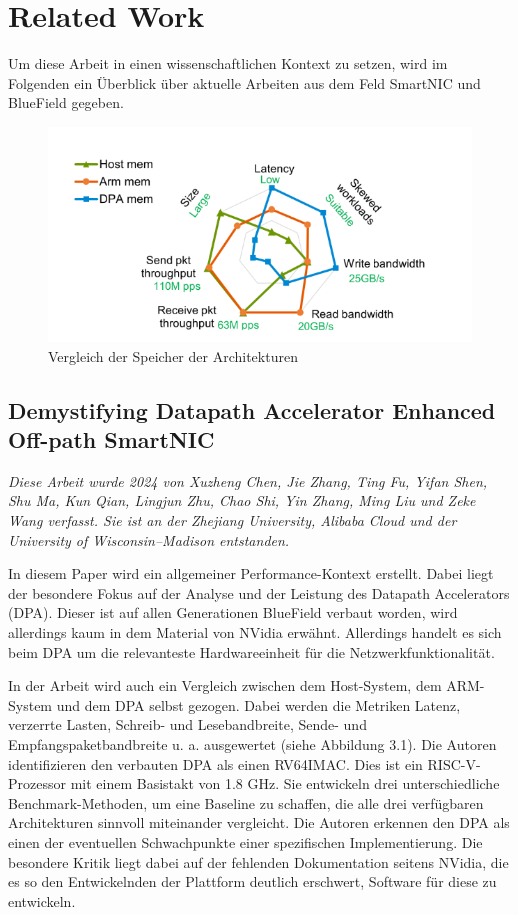 \chapter{Related Work}
Um diese Arbeit in einen wissenschaftlichen Kontext zu setzen, wird im Folgenden ein Überblick über aktuelle Arbeiten aus dem Feld SmartNIC und BlueField gegeben.
\begin{figure}
    \centering
    \includegraphics[width=0.7\linewidth]{images/DPARam.png}
    \caption{Vergleich der Speicher der Architekturen \cite{chen2024demystifying}}
    \label{fig:enter-label}
\end{figure}
\section{Demystifying Datapath Accelerator Enhanced Off-path SmartNIC}
\textit{Diese Arbeit wurde 2024 von Xuzheng Chen, Jie Zhang, Ting Fu, Yifan Shen, Shu Ma, Kun Qian, Lingjun Zhu, Chao Shi, Yin Zhang, Ming Liu und Zeke Wang verfasst. Sie ist an der Zhejiang University, Alibaba Cloud und der University of Wisconsin–Madison entstanden.}\cite{chen2024demystifying}

In diesem Paper wird ein allgemeiner Performance-Kontext erstellt. Dabei liegt der besondere Fokus auf der Analyse und der Leistung des Datapath Accelerators (DPA). Dieser ist auf allen Generationen BlueField verbaut worden, wird allerdings kaum in dem Material von NVidia erwähnt. Allerdings handelt es sich beim DPA um die relevanteste Hardwareeinheit für die Netzwerkfunktionalität. 

In der Arbeit wird auch ein Vergleich zwischen dem Host-System, dem ARM-System und dem DPA selbst gezogen. Dabei werden die Metriken Latenz, verzerrte Lasten, Schreib- und Lesebandbreite, Sende- und Empfangspaketbandbreite u. a. ausgewertet (siehe Abbildung 3.1). Die Autoren identifizieren den verbauten DPA als einen RV64IMAC. Dies ist ein RISC-V-Prozessor mit einem Basistakt von 1.8 GHz. Sie entwickeln drei unterschiedliche Benchmark-Methoden, um eine Baseline zu schaffen, die alle drei verfügbaren Architekturen sinnvoll miteinander vergleicht. Die Autoren erkennen den DPA als einen der eventuellen Schwachpunkte einer spezifischen Implementierung. Die besondere Kritik liegt dabei auf der fehlenden Dokumentation seitens NVidia, die es so den Entwickelnden der Plattform deutlich erschwert, Software für diese zu entwickeln.

